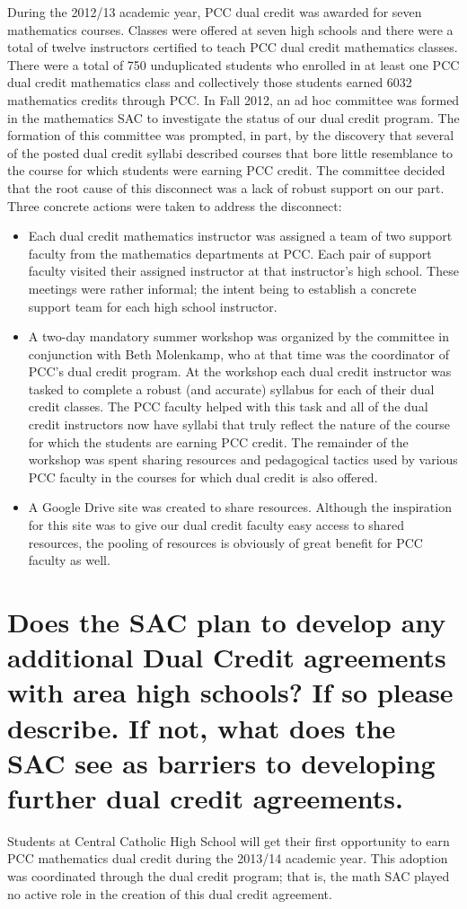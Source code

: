 During the 2012/13 academic year, PCC dual credit was awarded
for seven mathematics courses.  Classes were offered at seven high schools and
there were a total of twelve instructors certified to teach PCC dual credit
mathematics classes.  There were a total of 750 unduplicated students who
enrolled in at least one PCC dual credit mathematics class and collectively
those students earned 6032 mathematics credits through PCC.
In Fall 2012, an ad hoc committee was formed in the mathematics SAC to
investigate the status of our dual credit program.  The formation of this
committee was prompted, in part, by the discovery that several of the posted
dual credit syllabi described courses that bore little resemblance to the
course for which students were earning PCC credit.  The committee decided that
the root cause of this disconnect was a lack of robust support on our part.
Three concrete actions were taken to address the disconnect:
\begin{itemize}
	\item Each dual credit mathematics instructor was assigned a team of two support
	faculty from the mathematics departments at PCC.  Each pair of support faculty
	visited their assigned instructor at that instructor's high school.  These
	meetings were rather informal; the intent being to establish a concrete
	support team for each high school instructor.
	\item A two-day mandatory summer workshop was organized by the committee in
	conjunction with Beth Molenkamp, who at that time was the coordinator of
	PCC's dual credit program.  At the workshop each dual credit instructor was
	tasked to complete a robust (and accurate) syllabus for each of their dual
	credit classes.  The PCC faculty helped with this task and all of the dual
	credit instructors now have syllabi that truly reflect the nature of the
	course for which the students are earning PCC credit.  The remainder of the
	workshop was spent sharing resources and pedagogical tactics used by various
	PCC faculty in the courses for which dual credit is also offered.
	\item A Google Drive site was created to share resources.  Although the
	inspiration for this site was to give our dual credit faculty easy access to
	shared resources, the pooling of resources is obviously of great benefit for
	PCC faculty as well.
\end{itemize}

\section[Future dual credit relationships]{Does the SAC plan to develop any
 additional Dual Credit agreements with area high schools?  If so please
 describe.   If not, what does the SAC see as barriers to developing further dual
credit agreements. }
Students at Central Catholic High School will get their first opportunity to
earn PCC mathematics dual credit during the 2013/14 academic year.  This
adoption was coordinated through the dual credit program; that is, the math SAC
played no active role in the creation of this dual credit agreement.


